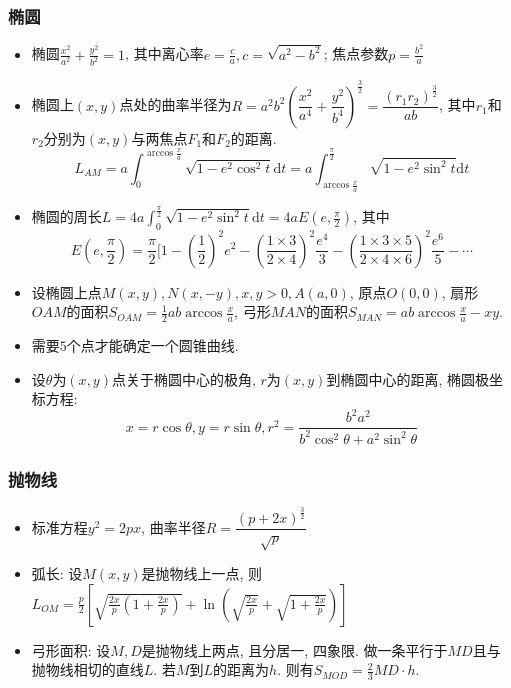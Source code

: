 \documentclass[landscape, twocolumn, 8pt, a4paper, twoside]{extarticle}
\begin{document}
\subsubsection{椭圆}
\begin{itemize}
\item 椭圆$\frac{x^2}{a^2} + \frac{y^2}{b^2} = 1$, 其中离心率$e = \frac{c}{a}, c = \sqrt{a^2 - b^2}$; 焦点参数$p = \frac{b^2}{a}$
\item 椭圆上$(x, y)$点处的曲率半径为$R = a^2 b^2 (\dfrac{x^2}{a^4} + \dfrac{y^2}{b^4})^\frac{3}{2} = \dfrac{(r_1 r_2)^\frac{3}{2}}{ab}$, 其中$r_1$和$r_2$分别为$(x, y)$与两焦点$F_1$和$F_2$的距离. %
  \[ L_{AM} = a \int_0^{\arccos{\frac{x}{a} }} \sqrt{1 - e^2 \cos^2 t} \textrm{d} t = a \int_{\arccos{\frac{x}{a} }}^\frac{\pi}{2} \sqrt{1 - e^2 \sin^2 t} \textrm{d} t\]
\item 椭圆的周长$L = 4a \int_0^{\frac{\pi}{2}} \sqrt{1 - e^2 \sin^2 t } \textrm{d} t = 4a E(e, \frac{\pi}{2})$, 其中
  \[ E(e, \frac{\pi}{2}) = \frac{\pi}{2} [ 1 - (\frac{1}{2})^2 e^2 - (\frac{1 \times 3}{2 \times 4})^2 \frac{e^4}{3} - (\frac{1 \times 3 \times 5}{2 \times 4 \times 6})^2 \frac{e^6}{5} - \cdots\]
\item 设椭圆上点$M(x, y), N(x, -y), x, y > 0, A(a, 0)$, 原点$O(0, 0)$, 扇形$OAM$的面积$S_{OAM} = \frac{1}{2} ab \arccos{\frac{x}{a}}$, 弓形$MAN$的面积$S_{MAN} = ab \arccos{\frac{x}{a}} - xy$.
\item 需要$5$个点才能确定一个圆锥曲线.
\item 设$\theta$为$(x, y)$点关于椭圆中心的极角, $r$为$(x, y)$到椭圆中心的距离, 椭圆极坐标方程:
  \[ x = r \cos \theta, y = r \sin \theta, r^2 = \frac{b^2 a^2}{b^2 \cos^2 \theta + a^2 \sin^2 \theta}\]
\end{itemize}

\subsubsection{抛物线}
\begin{itemize}
\item 标准方程$y^2 = 2px$, 曲率半径$ R = \dfrac{(p + 2x)^{\frac{3}{2} }}{\sqrt{p}}$
\item 弧长: 设$M(x, y)$是抛物线上一点, 则$L_{OM} = \frac{p}{2} [ \sqrt{\frac{2x}{p}(1 + \frac{2x}{p})} + \ln(\sqrt{\frac{2x}{p}} + \sqrt{1 + \frac{2x}{p}})]$
\item 弓形面积: 设$M, D$是抛物线上两点, 且分居一, 四象限. 做一条平行于$MD$且与抛物线相切的直线$L$. 若$M$到$L$的距离为$h$. 则有$S_{MOD} = \frac{2}{3}MD \cdot h$.
\end{itemize}
\end{document}
